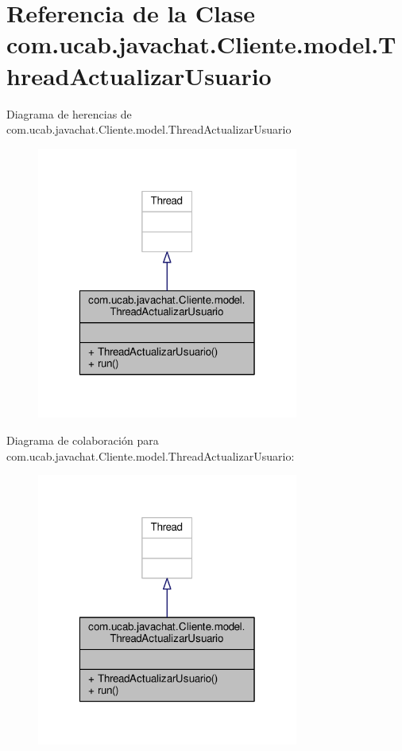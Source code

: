 \hypertarget{classcom_1_1ucab_1_1javachat_1_1_cliente_1_1model_1_1_thread_actualizar_usuario}{\section{Referencia de la Clase com.\-ucab.\-javachat.\-Cliente.\-model.\-Thread\-Actualizar\-Usuario}
\label{classcom_1_1ucab_1_1javachat_1_1_cliente_1_1model_1_1_thread_actualizar_usuario}
}


Diagrama de herencias de com.\-ucab.\-javachat.\-Cliente.\-model.\-Thread\-Actualizar\-Usuario
\nopagebreak
\begin{figure}[H]
\begin{center}
\leavevmode
\includegraphics[width=244pt]{de/d95/classcom_1_1ucab_1_1javachat_1_1_cliente_1_1model_1_1_thread_actualizar_usuario__inherit__graph}
\end{center}
\end{figure}


Diagrama de colaboración para com.\-ucab.\-javachat.\-Cliente.\-model.\-Thread\-Actualizar\-Usuario\-:
\nopagebreak
\begin{figure}[H]
\begin{center}
\leavevmode
\includegraphics[width=244pt]{de/d33/classcom_1_1ucab_1_1javachat_1_1_cliente_1_1model_1_1_thread_actualizar_usuario__coll__graph}
\end{center}
\end{figure}
